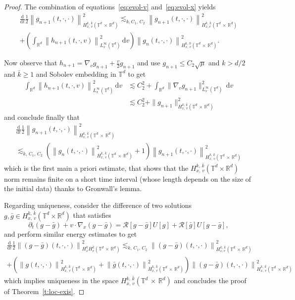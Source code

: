 \documentclass[AHL,Unicode,longabstracts,published]{cedram}
\newcommand{\R}{\mathbb{R}}
\newcommand{\T}{\mathbb{T}}
\newcommand*\fR{\mathcal{R}}
\newcommand\dt{{\frac{\mathrm d}{\mathrm dt}}}
\newcommand{\dd}{{\, \mathrm d}}
\begin{document}
\begin{proof}
The combination of equations~\eqref{eq:evol-v} and~\eqref{eq:evol-x} yields
\begin{multline}\label{eq:evol-global}
\dt \frac12 \left\| g_{n+1}(t,\cdot,\cdot)\right\|_{H^{k,\,\bar k}_{x,\,v}\left(\T^d\,\times\,\R^d\right)}^2 \lesssim_{k,C_1,\,C_2}
\left\| g_{n+1} (t,\cdot,\cdot) \right\|_{H^{\bar k,\,\bar k}_{x,v}\left(\T^d\,\times\,\R^d\right)}^2 \\
+ \left(\int_{\R^d} \left\| h_{n+1}(t,\cdot,v)
\right\|_{L^\infty_x(\T^d)}^2 \dd v \right) \left\| g_n(t,\cdot,\cdot) \right\|_{H^{k,\,0}_{x,\,v}\left(\T^d\,\times
\,\R^d\right)}^2.
\end{multline}

Now observe that $h_{n+1} = \nabla_v g_{n+1} + \frac{v}{2} g_{n+1}$ and use $g_{n+1} \le C_2 \sqrt\mu$ and $k>d/2$ and ${\bar k} \ge 1$ and Sobolev embedding in $\T^d$ to get
\begin{align*}
\int_{\R^d} \left\| h_{n+1}(t,\cdot,v) \right\|_{L^\infty_x(\T^d)} ^2 \dd v & \lesssim C_2^2+ \int_{\R^d} \| \nabla_v g_{n+1} \|_{L^\infty_x(\T^d)} ^2 \dd v \\
& \lesssim C_2^2 + \| g_{n+1} \|_{H^{k,\,\bar k}_{x,\,v} \left(\T^d\,\times\,\R^d\right)}^2
\end{align*}
and conclude finally that
\begin{multline}\label{eq:gronwall}
\dt \frac12 \left\| g_{n+1}(t,\cdot,\cdot)\right\|_{H^{k,\,\bar k}_{x,\,v}\left(\T^d\,\times\,\R^d\right)}^2 \\
\lesssim_{k,\,C_1,\,C_2}
\left(\left\| g_n(t,\cdot,\cdot) \right\|_{H^{k,\,\bar k}_{x,\,v}\left(\T^d\,\times\,\R^d\right)}^2 + 1 \right)
\left\| g_{n+1}(t,\cdot,\cdot) \right\|_{H^{k,\,\bar k}_{x,\,v}\left(\T^d\,\times\,\R^d\right)}^2
\end{multline}
which is the first main a priori estimate, that shows that the $H^{k,\,\bar k}_{x,\,v}(\T^d\times \R^d)$ norm remains finite on a short time interval (whose length depends on the size of the initial data) thanks to Gronwall's lemma.

Regarding uniqueness, consider the difference of two solutions $g,{\bar g} \in H^{k,\,\bar k}_{x,\,v}(\T^d \times \R^d)$ that satisfies
\[
\partial_t(g-{\bar g}) + v \cdot \nabla_x (g-{\bar g}) =
\fR[g-{\bar g}]U[g]+ \fR[{\bar g}] U[g-{\bar g}],
\]
and perform similar energy estimates to get
\begin{multline}\label{eq:difference}
\dt \frac12 \left\| (g-{\bar g})(t,\cdot,\cdot)
\right\|_{H^k_{x}H^{\bar k}_v\left(\T^d\,\times\,\R^d\right)}^2
\lesssim_{k,\,C_1,\,C_2} \left\| (g-{\bar g})(t,\cdot,\cdot)\right\|_{H^{k,\,\bar k}_{x,v}\left(\T^d\,\times \,\R^d\right)}^2 \\
+ \left(\left\| g(t,\cdot,\cdot)
\right\|_{H^{k,\,\bar k}_{x,\,v}\left(\T^d\,\times\,\R^d\right)}^2 + \left\| {\bar g}(t,\cdot,\cdot)
\right\|_{H^{k,\,\bar k}_{x,\,v}\left(\T^d\,\times\,\R^d\right)} ^2 \right)
\left\| (g-{\bar g})(t,\cdot,\cdot)
\right\|_{H^{k,\,\bar k}_{x,\,v}\left(\T^d\,\times\,\R^d\right)}^2
\end{multline}
which implies uniqueness in the space $H^{k,\,\bar k}_{x,\,v}(\T^d\,\times\,\R^d)$ and concludes the proof of Theorem~\ref{t:loc-exis}.
\end{proof}
\end{document}
